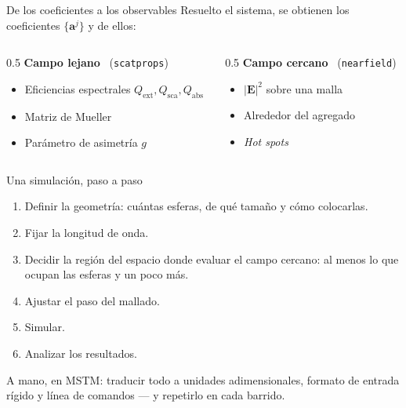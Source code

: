 \documentclass[aspectratio=43,11pt]{beamer}
\begin{document}
\begin{frame}{De los coeficientes a los observables}
  \vspace{6pt}
  Resuelto el sistema, se obtienen los coeficientes $\{\mathbf{a}^j\}$ y de ellos:
  \vspace{8pt}
  \begin{columns}[T]
    \begin{column}{0.5\textwidth}
      \textbf{\color{oro}Campo lejano} \ {\footnotesize(\texttt{scatprops})}
      \begin{itemize}\footnotesize
        \item Eficiencias espectrales $Q_\text{ext},Q_\text{sca},Q_\text{abs}$
        \item Matriz de Mueller
        \item Parámetro de asimetría $g$
      \end{itemize}
    \end{column}
    \begin{column}{0.5\textwidth}
      \textbf{\color{oro}Campo cercano} \ {\footnotesize(\texttt{nearfield})}
      \begin{itemize}\footnotesize
        \item $|\mathbf{E}|^2$ sobre una malla
        \item Alrededor del agregado
        \item \textit{Hot spots}
      \end{itemize}
    \end{column}
  \end{columns}
\end{frame}



\begin{frame}{Una simulación, paso a paso}
  \vspace{6pt}
  \begin{enumerate}
    \setlength{\itemsep}{10pt}
    \item Definir la \alert{geometría}: cuántas esferas, de qué tamaño y cómo colocarlas.
    \item Fijar la \alert{longitud de onda}.
    \item Decidir la \alert{región del espacio} donde evaluar el campo cercano: al menos lo que ocupan las esferas y un poco más.
    \item Ajustar el \alert{paso del mallado}.
    \item \alert{Simular}.
    \item \alert{Analizar} los resultados.
  \end{enumerate}
  \vspace{10pt}
  \begin{center}{\footnotesize\color{pizarra2} A mano, en MSTM: traducir todo a unidades adimensionales, formato de entrada rígido y línea de comandos --- y repetirlo en cada barrido.}\end{center}
\end{frame}
\end{document}

